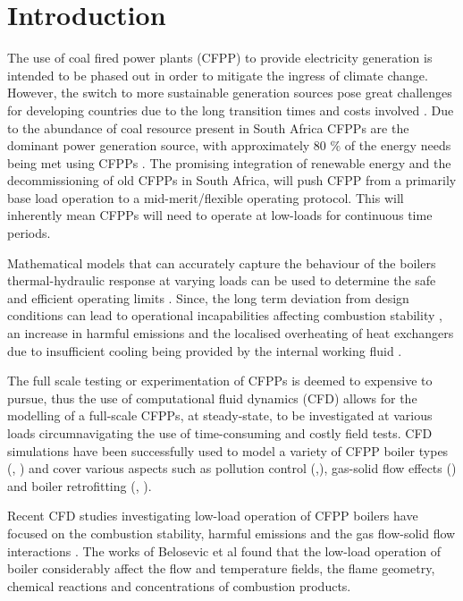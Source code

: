 \documentclass[review]{elsarticle}
\begin{document}
\section{Introduction}
The use of coal fired power plants (CFPP) to provide electricity generation is intended to be phased out in order to mitigate the ingress of climate change. However, the switch to more sustainable generation sources pose great challenges for developing countries due to the long transition times and costs involved \cite{ugum2019}. Due to the abundance of coal resource present in South Africa CFPPs are the dominant power generation source, with approximately 80 $\%$ of the energy needs being met using CFPPs \cite{eskom}. The promising integration of renewable energy and the decommissioning of old CFPPs in South Africa, will push CFPP from a primarily base load operation to a mid-merit/flexible operating protocol. This will inherently mean CFPPs will need to operate at low-loads for continuous time periods. 

Mathematical models that can accurately capture the behaviour of the boilers thermal-hydraulic response at varying loads can be used to determine the safe and efficient operating limits \cite{Laubscher2019b}. Since, the long term deviation from design conditions can lead to operational incapabilities affecting combustion stability \cite{Hernik2020}, an increase in harmful emissions \cite{Chang2021} and the localised overheating of heat exchangers due to insufficient cooling being provided by the internal working fluid \cite{Modlinski2019}.

The full scale testing or experimentation of CFPPs is deemed to expensive to pursue, thus the use of computational fluid dynamics (CFD) allows for the modelling of a full-scale CFPPs, at steady-state, to be investigated at various loads circumnavigating the use of time-consuming and costly field tests. CFD simulations have been successfully used to model a variety of CFPP boiler types (\cite{Laubscher2019a}, \cite{Gu2020}) and cover various aspects such as pollution control (\cite{Du2017},\cite{Fan2001}), gas-solid flow effects (\cite{Chen2017}) and boiler retrofitting (\citep{Gu2020}, \cite{He2007}).

Recent CFD studies investigating low-load operation of CFPP boilers have focused on the combustion stability, harmful emissions and the gas flow-solid flow interactions \cite{Jiang2021}. The works of Belosevic et al \citep{Belosevic2019a} found that the low-load operation of boiler considerably affect the flow and temperature fields, the flame geometry, chemical reactions and concentrations of combustion products.
\end{document}
